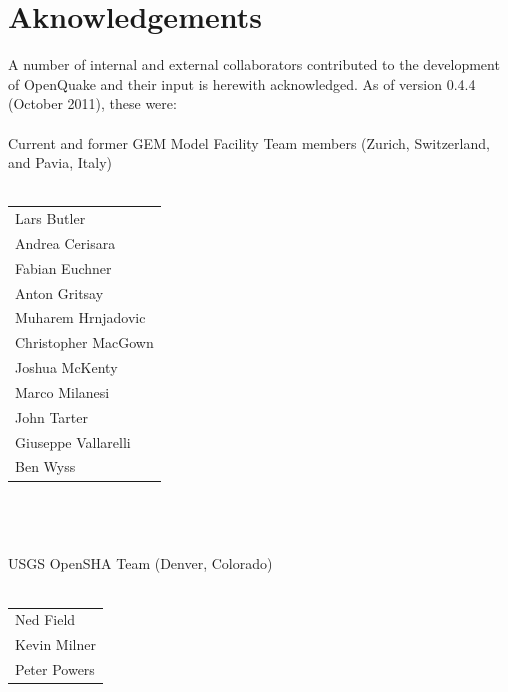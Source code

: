 \chapter*{Aknowledgements}
A number of internal and external collaborators contributed to 
the development of OpenQuake and their input is herewith acknowledged. 
As of version 0.4.4 (October 2011), these were: \hfill \\
\hfill \\
Current and former GEM Model Facility Team members (Zurich, Switzerland,
and Pavia, Italy) \hfill \\
\hfill \\
\begin{tabular}{l}
Lars Butler \\
Andrea Cerisara \\
Fabian Euchner \\
Anton Gritsay \\
Muharem Hrnjadovic \\
Christopher MacGown \\
Joshua McKenty \\
Marco Milanesi \\
John Tarter \\
Giuseppe Vallarelli \\
Ben Wyss \\
\end{tabular} \hfill \\
%
\hfill \\
\hfill \\
USGS OpenSHA Team (Denver, Colorado) \hfill \\
\hfill \\
\begin{tabular}{l}
Ned Field \\
Kevin Milner \\
Peter Powers \\
\end{tabular}


